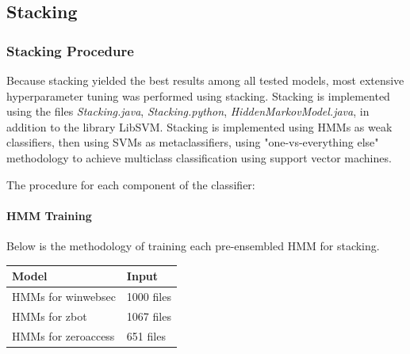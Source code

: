 \documentclass[12pt]{article}
\begin{document}
\subsection{Stacking}
  \subsubsection{Stacking Procedure}
  Because stacking yielded the best results among all tested models, most extensive hyperparameter tuning was performed using stacking. Stacking is implemented using the files \textit{Stacking.java}, \textit{Stacking.python}, \textit{HiddenMarkovModel.java}, in addition to the library LibSVM. Stacking is implemented using HMMs as weak classifiers, then using SVMs as metaclassifiers, using "one-vs-everything else"  methodology to achieve multiclass classification using support vector machines.

The procedure for each component of the classifier:
\paragraph{HMM Training}
Below is the methodology of training each pre-ensembled HMM for stacking.
\begin{table}[H]
    \centering
    \begin{tabular}{|l|p{}|}
    \hline \textbf{Model} & \textbf{Input} \\\hline \hline
    HMMs for winwebsec   & 
          1000 files 
          \\\hline
    HMMs for zbot   & 
     1067 files 
    \\\hline
     HMMs for zeroaccess
     & 
    651 files
  \\\hline
  \end{tabular}
  \end{table}  
  \newpage
\end{document}
